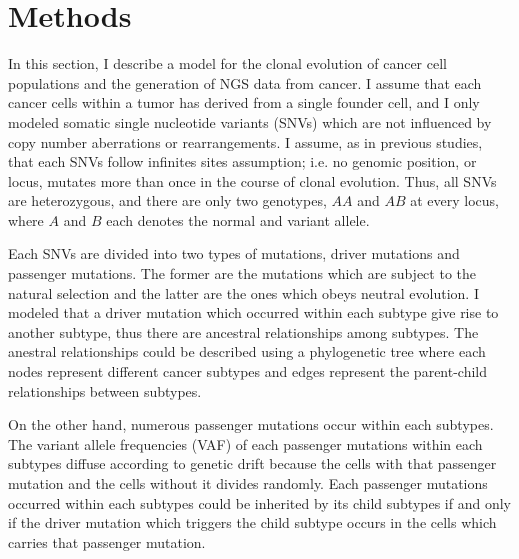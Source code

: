 \documentclass{article}
\begin{document}
        
 \section{Methods}

In this section, I describe a model for the clonal evolution of cancer cell populations and the generation of NGS data from cancer.
I assume that each cancer cells within a tumor has derived from a single founder cell, and I only modeled somatic single nucleotide variants (SNVs) which are not influenced by copy number aberrations or rearrangements. I assume, as in previous studies, that each SNVs follow infinites sites assumption; i.e. no genomic position, or locus, mutates more than once in the course of clonal evolution. Thus, all SNVs are heterozygous, and there are only two genotypes, $AA$ and $AB$ at every locus, where $A$ and $B$ each denotes the normal and variant allele.

Each SNVs are divided into two types of mutations, driver mutations and passenger mutations. The former are the mutations which are subject to the natural selection and the latter are the ones which obeys neutral evolution. I modeled that a driver mutation which occurred within each subtype give rise to another subtype, thus there are ancestral relationships among subtypes. The anestral relationships could be described using a phylogenetic tree where each nodes represent different cancer subtypes and edges represent the parent-child relationships between subtypes.

On the other hand, numerous passenger mutations occur within each subtypes. The variant allele frequencies (VAF) of each passenger mutations within each subtypes diffuse according to genetic drift because the cells with that passenger mutation and the cells without it divides randomly. Each passenger mutations occurred within each subtypes could be inherited by its child subtypes if and only if the driver mutation which triggers the child subtype occurs in the cells which carries that passenger mutation.
\end{document}
